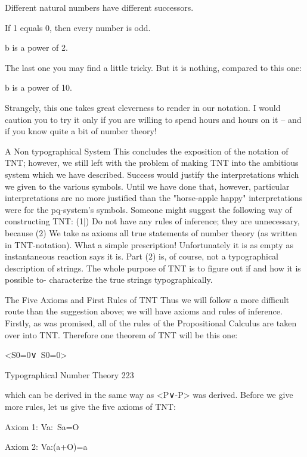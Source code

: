                        Different natural numbers have different successors.

                              If 1 equals 0, then every number is odd.

                                         b is a power of 2.

The last one you may find a little tricky. But it is nothing, compared to this one:

       b is a power of 10.

Strangely, this one takes great cleverness to render in our notation. I would caution you to
try it only if you are willing to spend hours and hours on it -- and if you know quite a bit
of number theory!

                             A Non typographical System
This concludes the exposition of the notation of TNT; however, we still left with the
problem of making TNT into the ambitious system which we have described. Success
would justify the interpretations which we given to the various symbols. Until we have
done that, however, particular interpretations are no more justified than the "horse-apple
happy" interpretations were for the pq-system's symbols.
        Someone might suggest the following way of constructing TNT: (1|) Do not have
any rules of inference; they are unnecessary, because (2) We take as axioms all true
statements of number theory (as written in TNT-notation). What a simple prescription!
Unfortunately it is as empty as instantaneous reaction says it is. Part (2) is, of course, not
a typographical description of strings. The whole purpose of TNT is to figure out if and
how it is possible to- characterize the true strings typographically.

                    The Five Axioms and First Rules of TNT
Thus we will follow a more difficult route than the suggestion above; we will have
axioms and rules of inference. Firstly, as was promised, all of the rules of the
Propositional Calculus are taken over into TNT. Therefore one theorem of TNT will be
this one:


                                      <S0=0∨~S0=0>


Typographical Number Theory                                                               223

which can be derived in the same way as <P∨-P> was derived.
       Before we give more rules, let us give the five axioms of TNT:

Axiom 1: Va:~Sa=O

Axiom 2: Va:(a+O)=a

